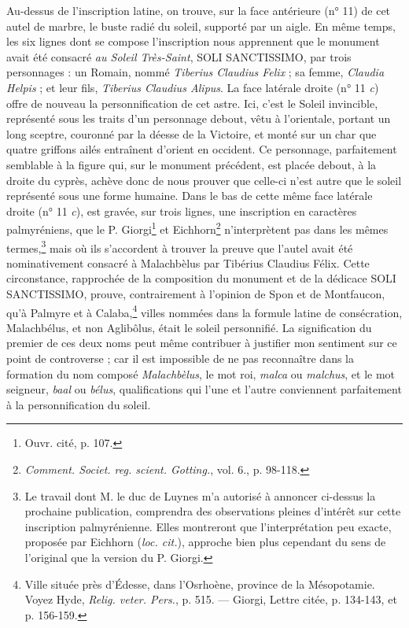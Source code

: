 \documentclass[a4paper, 11pt, oneside, polutonikogreek, french]{article}
\begin{document}
Au-dessus de l'inscription latine, on trouve, sur la face antérieure (n° 11) de cet autel de marbre, le buste radié du soleil, supporté par un aigle. En même temps, les six lignes dont se compose l'inscription nous apprennent que le monument avait été consacré \emph{au Soleil Très-Saint}, SOLI SANCTISSIMO, par trois personnages : un Romain, nommé \emph{Tiberius Claudius Felix} ; sa femme, \emph{Claudia Helpis} ; et leur fils, \emph{Tiberius Claudius Alipus}. La face latérale droite (n° 11 \emph{c}) offre de nouveau la personnification de cet astre. Ici, c'est le Soleil invincible, représenté sous les traits d'un personnage debout, vêtu à l'orientale, portant un long sceptre, couronné par la déesse de la Victoire, et monté sur un char que quatre griffons ailés entraînent d'orient en occident. Ce personnage, parfaitement semblable à la figure qui, sur le monument précédent, est placée debout, à la droite du cyprès, achève donc de nous prouver que celle-ci n'est autre que le soleil représenté sous une forme humaine. Dans le bas de cette même face latérale droite (n° 11 \emph{c}), est gravée, sur trois lignes, une inscription en caractères palmyréniens, que le P. Giorgi\footnote{Ouvr. cité, p. 107.} et Eichhorn\footnote{\emph{Comment. Societ. reg. scient. Gotting.}, vol. 6., p. 98-118.} n'interprètent pas dans les mêmes termes,\footnote{Le travail dont M. le duc de Luynes m'a autorisé à annoncer ci-dessus la prochaine publication, comprendra des observations pleines d'intérêt sur cette inscription palmyrénienne. Elles montreront que l'interprétation peu exacte, proposée par Eichhorn (\emph{loc. cit.}), approche bien plus cependant du sens de l'original que la version du P. Giorgi.} mais où ils s'accordent à trouver la preuve que l'autel avait été nominativement consacré à Malachbèlus par Tibérius Claudius Félix. Cette circonstance, rapprochée de la composition du monument et de la dédicace SOLI SANCTISSIMO, prouve, contrairement à l'opinion de Spon et de Montfaucon, qu'à Palmyre et à Calaba,\footnote{Ville située près d'Édesse, dans l'Osrhoène, province de la Mésopotamie. Voyez Hyde, \emph{Relig. veter. Pers.}, p. 515. --- Giorgi, Lettre citée, p. 134-143, et p. 156-159.} villes nommées dans la formule latine de consécration, Malachbélus, et non Aglibôlus, était le soleil personnifié. La signification du premier de ces deux noms peut même contribuer à justifier mon sentiment sur ce point de controverse ; car il est impossible de ne pas reconnaître dans la formation du nom composé \emph{Malachbèlus}, le mot roi, \emph{malca} ou \emph{malchus}, et le mot seigneur, \emph{baal} ou \emph{bélus}, qualifications qui l'une et l'autre conviennent parfaitement à la personnification du soleil.
\end{document}
